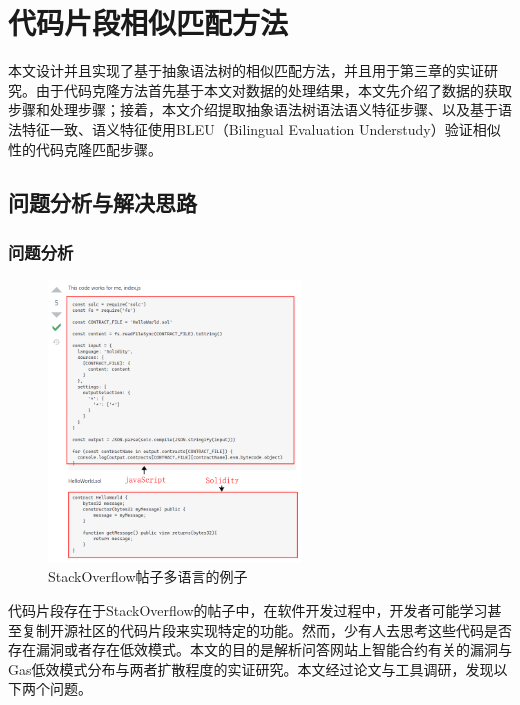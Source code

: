 
\newcommand{\tabincell}[2]{\begin{tabular}{@{}#1@{}}#2\end{tabular}}

\chapter{代码片段相似匹配方法}

本文设计并且实现了基于抽象语法树的相似匹配方法，并且用于第三章的实证研究。由于代码克隆方法首先基于本文对数据的处理结果，本文先介绍了数据的获取步骤和处理步骤；接着，本文介绍提取抽象语法树语法语义特征步骤、以及基于语法特征一致、语义特征使用BLEU（Bilingual Evaluation Understudy）验证相似性的代码克隆匹配步骤。


\section{问题分析与解决思路}
\subsection{问题分析}

\begin{figure}[htbp]
\centering
\includegraphics[width=0.6\textwidth]{figures/multi-lan-example.png}
\caption{StackOverflow帖子多语言的例子}
\label{multi-lan}
\end{figure}

代码片段存在于StackOverflow的帖子中，在软件开发过程中，开发者可能学习甚至复制开源社区的代码片段来实现特定的功能。然而，少有人去思考这些代码是否存在漏洞或者存在低效模式。本文的目的是解析问答网站上智能合约有关的漏洞与Gas低效模式分布与两者扩散程度的实证研究。本文经过论文与工具调研，发现以下两个问题。

